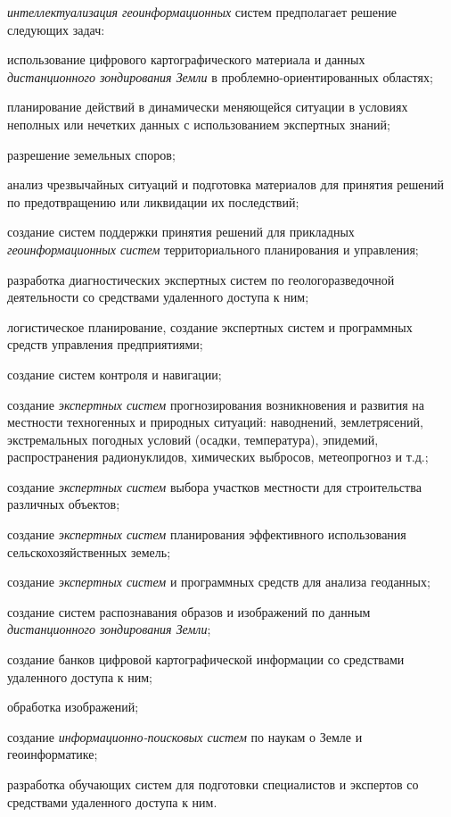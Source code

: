 \textit{интеллектуализация геоинформационных} систем предполагает решение следующих задач:
\begin{textitemize}
	\item использование цифрового картографического материала и данных \textit{дистанционного зондирования Земли} в проблемно-ориентированных областях;
	\item планирование действий в динамически меняющейся ситуации в условиях неполных или нечетких данных с использованием экспертных знаний; 
	\item разрешение земельных споров;
	\item анализ чрезвычайных ситуаций и подготовка материалов для принятия решений по предотвращению или ликвидации их последствий; 
	\item создание систем поддержки принятия решений для прикладных \textit{геоинформационных систем} территориального планирования и управления; 
	\item разработка диагностических экспертных систем по геологоразведочной деятельности со средствами удаленного доступа к ним;
	\item логистическое планирование, создание экспертных систем и программных средств управления предприятиями;
	\item создание систем контроля и навигации;
	\item создание \textit{экспертных систем} прогнозирования возникновения и развития на местности техногенных и природных ситуаций: наводнений, землетрясений, экстремальных погодных условий (осадки, температура), эпидемий, распространения радионуклидов, химических выбросов, метеопрогноз и т.д.;
	\item создание \textit{экспертных систем} выбора участков местности для строительства различных объектов;
	\item создание \textit{экспертных систем} планирования эффективного использования сельскохозяйственных земель;
	\item создание \textit{экспертных систем} и программных средств для анализа геоданных;
	\item создание систем распознавания образов и изображений по данным \textit{дистанционного зондирования Земли};
	\item создание банков цифровой картографической информации со средствами удаленного доступа к ним;
	\item обработка изображений;
	\item создание \textit{информационно-поисковых систем} по наукам о Земле и геоинформатике;
	\item разработка обучающих систем для подготовки специалистов и экспертов со средствами удаленного доступа к ним.
\end{textitemize}

